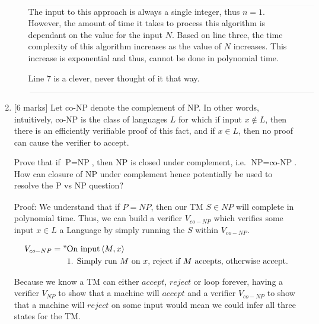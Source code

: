 \documentclass{article}
\newcommand{\class}[1]{\text{#1}}
\newcommand{\enc}[1]{\left<#1\right>}
\begin{document}
\begin{enumerate}
\begin{enumerate}
            $\textcolor[RGB]{220,220,220}{\rule{\linewidth}{0.2pt}}$
            The input to this approach is always a single integer, thus $n = 1$.
            However, the amount of time it takes to process this algorithm is dependant on the value for the input $N$.
            Based on line three, the time complexity of this algorithm increases as the value of $N$ increases.
            This increase is exponential and thus, cannot be done in polynomial time.

            Line 7 is a clever, never thought of it that way.

            $\textcolor[RGB]{220,220,220}{\rule{\linewidth}{0.2pt}}$

    \end{enumerate}
    \item {[6 marks]}
          Let co-NP denote the complement of NP. In other words, intuitively, co-NP is the class of languages $L$ for which if input $x\not\in L$, then there is an efficiently verifiable proof of this fact, and if $x\in L$, then no proof can cause the verifier to accept.

            Prove that if $\class{P}=\class{NP}$, then NP is closed under complement, i.e. $\class{NP}=\class{co-NP}$. How can closure of NP under complement hence potentially be used to resolve the P vs NP question?

            $\textcolor[RGB]{220,220,220}{\rule{\linewidth}{0.2pt}}$
            Proof: We understand that if $P = NP$, then our TM $S \in NP$ will complete in polynomial time. Thus, we can build a verifier $V_{co-NP}$ which verifies some input $x \in L$ a Language by simply running the $S$ within $V_{co-NP}$.

            \begin{equation}
            	\begin{split}
            		V_{co-NP} = "& \text{On input} \enc{M, x} \\
            				     & \text{1. Simply run $M$ on $x$, reject if $M$ accepts, otherwise accept.}
            	\end{split}
            \end{equation}

            Because we know a TM can either $accept$, $reject$ or loop forever, having a verifier $V_{NP}$ to show that a machine will $accept$ and a verifier $V_{co-NP}$ to show that a machine will $reject$ on some input would mean we could infer all three states for the TM.


\end{enumerate}
\end{document}
